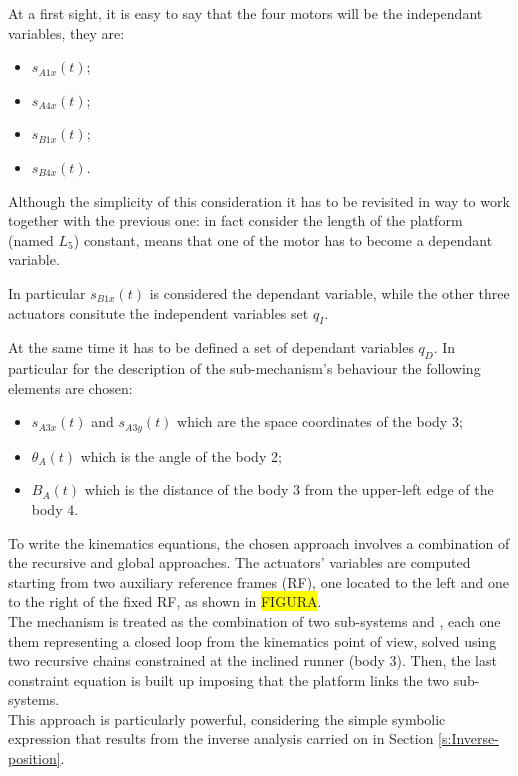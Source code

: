 \documentclass[10.5pt, twocolumn]{article}
\newcommand*\circled[1]{\tikz[baseline=(char.base)]{
	\node[shape=circle,draw,inner sep=2pt] (char) {#1};}}
\begin{document}
At a first sight, it is easy to say that the four motors will be the independant variables, they are:
\begin{itemize}
  \item \( s_{A1x}(t) \);
  \item \( s_{A4x}(t) \);
  \item \( s_{B1x}(t) \);
  \item \( s_{B4x}(t) \).
\end{itemize}
Although the simplicity of this consideration it has to be revisited in way to work together with the previous one: in fact consider the length of the platform (named \( L_5\)) constant, means that one of the motor has to become a dependant variable.

In particular \( s_{B1x}(t) \) is considered the dependant variable, while the other three actuators consitute the independent variables set \( q_{I} \).

At the same time it has to be defined a set of dependant variables \( q_{D} \).
In particular for the description of the sub-mechanism's behaviour the following elements are chosen:
\begin{itemize}
  \item \( s_{A3x}(t) \) and \( s_{A3y}(t) \) which are the space coordinates of the body 3;
  \item \( \theta_A(t) \) which is the angle of the body 2;
  \item \( B_A(t) \) which is the distance of the body 3 from the upper-left edge of the body 4.
\end{itemize}

To write the kinematics equations, the chosen approach involves a combination of the recursive and global approaches. The actuators' variables are computed starting from two auxiliary reference frames (RF), one located to the left and one to the right of the fixed RF, as shown in \colorbox{yellow}{FIGURA}.\\
The mechanism is treated as the combination of two sub-systems \circled{A} and \circled{B}, each one them representing a closed loop from the kinematics point of view, solved using two recursive chains constrained at the inclined runner (body 3). Then, the last constraint equation is built up imposing that the platform links the two sub-systems.\\
This approach is particularly powerful, considering the simple symbolic expression that results from the inverse analysis carried on in Section \ref{s:Inverse-position}.
\end{document}
